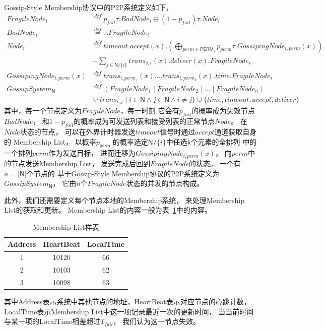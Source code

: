 Gossip-Style Membership协议中的P2P系统定义如下，
\begin{equation}\label{eq:network_system}
   \begin{split}
    FragileNode_i&\stackrel{def}{=}p_{fail}\tau.BadNode_i\oplus (1-p_{fail})\tau.Node_i\\
    BadNode_i&\stackrel{def}{=}\tau.FragileNode_i\\
    Node_i&\stackrel{def}{=}timeout.accept(x).(\bigoplus_{perm\in \mathsf{PERM}_i} p_{perm}\tau.GossipingNode_{i,perm}(x))\\
     &+\sum_{j\in \mathsf{N}/\{i\}}trans_{j,i}(x).\overline{deliver}(x).FragileNode_i\\
    GossipingNode_{i,perm}(x)&\stackrel{def}{=}\overline{trans_{i,perm_{1}}}(x).\dots \overline{trans_{i,perm_{b}}}(x).\overline{time}.FragileNode_i\\
    GossipSystem_\mathsf{N}&\stackrel{def}{=}(FragileNode_1\mid FragileNode_2\mid \dots \mid FragileNode_n)\\
    &\backslash \{trans_{i,j}\mid i\in \mathsf{N} \wedge j\in \mathsf{N} \wedge i\neq j\}\cup \{time, timeout, accept, deliver\}
   \end{split}
   \end{equation}
 其中，每一个节点定义为$FragileNode$，每一时刻
 它会有$p_{fail}$的概率成为失效节点$BadNode$，
 和$1-p_{fail}$的概率成为可发送列表和接受列表的正常节点$Node$。
 在$Node$状态的节点，
 可以在外界计时器发送$timeout$信号时通过$accept$通道获取自身的
 Membership List，
 以概率$p_{\mathsf{perm}}$
 的概率选定$\mathsf{N}/\{i\}$中任选$\mathsf{k}$个元素的全排列
 中的一个排列$perm$作为发送目标，
 进而迁移为$GossipingNode_{i,perm}(x)$，
 向$perm$中的节点发送Membership List，
 发送完成后回到$FragileNode$的状态。
 一个有$n=|\mathsf{N}|$个节点的
 基于Gossip-Style Membership协议的P2P系统定义为
 $GossipSystem_{\mathsf{N}}$，
 它由$n$个$FragileNode$状态的并发的节点构成。

 此外，我们还需要定义每个节点本地的Membership系统，
 来处理Membership List的获取和更新。
 Membership List的内容一般为表~\ref{tab:membership_list}中的内容。
\begin{table}[!hpt]
    \caption{Membership List样表}
    \label{tab:membership_list}
    \centering
    \begin{tabular}{@{}ccc@{}} \toprule
      Address & HeartBeat & LocalTime \\ \midrule
      1 & 10120 & 66\\
      2 & 10103 & 62\\
      3 & 10098 & 63\\ \bottomrule
    \end{tabular}
  \end{table}
其中Address表示系统中其他节点的地址，HeartBeat表示对应节点的心跳计数，
LocalTime表示Membership List中这一项记录最近一次的更新时间，
当当前时间与某一项的LocalTime相差超过$T_{fail}$，
我们认为这一节点失效。


